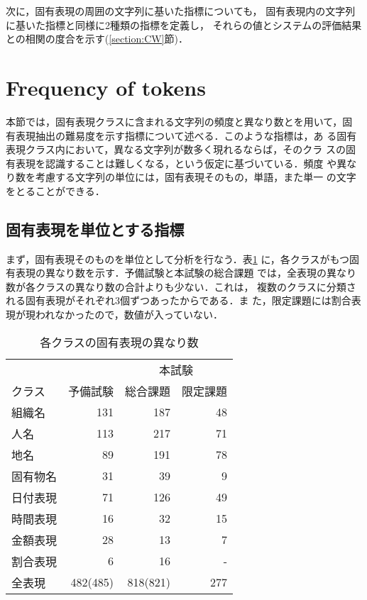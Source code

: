 次に，固有表現の周囲の文字列に基いた指標についても，
固有表現内の文字列に基いた指標と同様に2種類の指標を定義し，
それらの値とシステムの評価結果との相関の度合を示す(\ref{section:CW}節)．

\section{\label{section:FT}Frequency of tokens}

本節では，固有表現クラスに含まれる文字列の頻度と異なり数とを用いて，固
有表現抽出の難易度を示す指標について述べる．このような指標は，あ
る固有表現クラス内において，異なる文字列が数多く現れるならば，そのクラ
スの固有表現を認識することは難しくなる，という仮定に基づいている．頻度
や異なり数を考慮する文字列の単位には，固有表現そのもの，単語，また単一
の文字をとることができる．

\subsection{\label{subsec:FE}固有表現を単位とする指標}

まず，固有表現そのものを単位として分析を行なう．表\ref{table:FE_first}
に，各クラスがもつ固有表現の異なり数を示す．予備試験と本試験の総合課題
では，全表現の異なり数が各クラスの異なり数の合計よりも少ない．これは，
複数のクラスに分類される固有表現がそれぞれ3個ずつあったからである．ま
た，限定課題には割合表現が現われなかったので，数値が入っていない．

\begin{table}[t]\small
\caption{\label{table:FE_first}各クラスの固有表現の異なり数}
\begin{center}
\begin{tabular}{|l||r|r|r|} \hline
         &          & \multicolumn{2}{|c|}{本試験}\\ \cline{3-4}
クラス   & 予備試験 & 総合課題 & 限定課題 \\ \hline \hline
組織名   &  131 & 187 & 48 \\ \hline
人名     &  113 & 217 & 71 \\ \hline
地名     &   89 & 191 & 78 \\ \hline
固有物名 &   31 &  39 &  9 \\ \hline
日付表現 &   71 & 126 & 49 \\ \hline
時間表現 &   16 &  32 & 15 \\ \hline
金額表現 &   28 &  13 &  7 \\ \hline
割合表現 &    6 &  16 &  - \\ \hline \hline
全表現   &  482(485) & 818(821) & 277 \\ \hline
\end{tabular}
\end{center}
\end{table}

